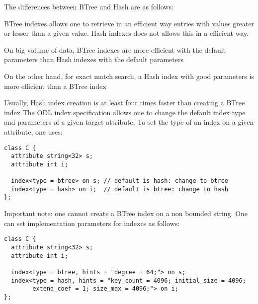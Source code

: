 The differences between BTree and Hash are as follows:
\bi
\item BTree indexes allows one to retrieve in an efficient way
entries with values greater or lesser than a given value. Hash indexes
does not allows this in a efficient way.
\item On big volume of data, BTree indexes are more efficient 
with the default parameters than Hash indexes with the default parameters
\item On the other hand, for exact match search, a Hash index
with good parameters is more efficient than a BTree index
\item Usually, Hash index creation is at least four times faster
than creating a BTree index
\ei
The ODL index specification allows one to change the default index
type and parameters of a given target attribute.
To set the type of an index on a given attribute, one uses:
\begin{verbatim}
class C {
  attribute string<32> s;
  attribute int i;

  index<type = btree> on s; // default is hash: change to btree
  index<type = hash> on i;  // default is btree: change to hash
};
\end{verbatim}
Important note: one cannot create a BTree index on a non bounded string.
One can set implementation parameters for indexes as follows:
\begin{verbatim}
class C {
  attribute string<32> s;
  attribute int i;

  index<type = btree, hints = "degree = 64;"> on s;
  index<type = hash, hints = "key_count = 4096; initial_size = 4096;
        extend_coef = 1; size_max = 4096;"> on i;
};
\end{verbatim}



